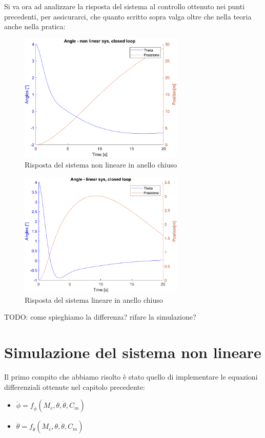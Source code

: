 Si va ora ad analizzare la risposta del sistema al controllo ottenuto nei punti precedenti, per assicurarci, che quanto scritto sopra valga oltre che nella teoria anche nella pratica:
\begin{figure}[H]
	\centering   	
	\includegraphics[width=0.7\textwidth]{Immagini/closed_loop_non_linear.png}
	\caption{Risposta del sistema non lineare in anello chiuso}
	\label{fig:closed_loop_non_linear_response}
\end{figure}
\begin{figure}[H]
	\centering   	
	\includegraphics[width=0.7\textwidth]{Immagini/closed_loop_linear.png}
	\caption{Risposta del sistema lineare in anello chiuso}
	\label{fig:closed_loop_linear_response}
\end{figure}
TODO: come spieghiamo la differenza? rifare la simulazione?



\section{Simulazione del sistema non lineare}

Il primo compito che abbiamo risolto è stato quello di implementare le equazioni differenziali ottenute nel capitolo precedente:
\begin{itemize}
	\item $\ddot{\phi} = f_{\ddot{\phi}} (M_c,\theta,\dot{\theta},C_m)$
	\item $\ddot{\theta} = f_{\ddot{\theta}} (M_c,\theta,\dot{\theta},C_m)$
\end{itemize}

